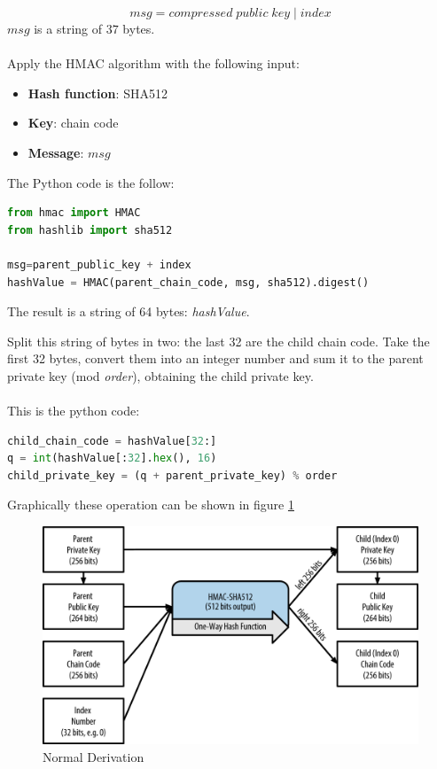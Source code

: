 \begin{equation*}
msg = compressed \; public\;key \;|\; index
\end{equation*}
$msg$ is a string of $37$ bytes. \\ \\
Apply the HMAC algorithm with the following input:

\begin{itemize}[label=$\odot$]
	\item \textbf{Hash function}: SHA512
	\item \textbf{Key}: chain code
	\item \textbf{Message}: $msg$
\end{itemize}
The Python code is the follow:
\begin{lstlisting}[language=Python]
from hmac import HMAC
from hashlib import sha512

msg=parent_public_key + index
hashValue = HMAC(parent_chain_code, msg, sha512).digest()
\end{lstlisting}
\begin{flushleft}
	The result is a string of 64 bytes: \textit{hashValue}.
\end{flushleft}
Split this string of bytes in two: the last 32 are the child chain code. Take the first 32 bytes, convert them into an integer number and sum it to the parent private key (mod \textit{order}), obtaining the child private key.\\ \\
This is the python code:

\begin{lstlisting}[language=Python]
child_chain_code = hashValue[32:]
q = int(hashValue[:32].hex(), 16)
child_private_key = (q + parent_private_key) % order
\end{lstlisting}

\begin{flushleft}
	Graphically these operation can be shown in figure \ref{fig:normal_derivation}
\end{flushleft}

\begin{figure}[ht!]
	\centering
	\includegraphics[width=15cm]{Figures/normal_derivation.png}
	\caption{Normal Derivation }
	\label{fig:normal_derivation}
\end{figure}


